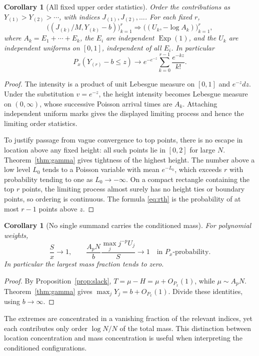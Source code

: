 \documentclass[11pt,a4paper]{article}
\numberwithin{equation}{section}
\newtheorem{corollary}[theorem]{Corollary}
\theoremstyle{definition}
\theoremstyle{remark}
\newcommand{\Exp}{\operatorname{Exp}}
\begin{document}
\begin{corollary}[All fixed upper order statistics]
\label{cor:orderstats}
Order the contributions as $Y_{(1)}>Y_{(2)}>\cdots$, with indices
$J_{(1)},J_{(2)},\ldots$. For each fixed $r$,
\begin{equation}
 \big((J_{(k)}/M,Y_{(k)}-b)\big)_{k=1}^r
 \Rightarrow \big((U_k,-\log A_k)\big)_{k=1}^r,
 \label{eq:orderstats}
\end{equation}
where $A_k=E_1+\cdots+E_k$, the $E_i$ are independent $\Exp(1)$,
and the $U_k$ are independent uniforms on $[0,1]$, independent of all
$E_i$. In particular
\begin{equation}
 P_x(Y_{(r)}-b\le z)\longrightarrow
 e^{-e^{-z}}\sum_{k=0}^{r-1}\frac{e^{-kz}}{k!}.
 \label{eq:rth}
\end{equation}
\end{corollary}
\begin{proof}
The intensity is a product of unit Lebesgue measure on $[0,1]$ and
$e^{-z}dz$. Under the substitution $v=e^{-z}$, the height intensity
becomes Lebesgue measure on $(0,\infty)$, whose successive Poisson
arrival times are $A_k$. Attaching independent uniform marks gives
the displayed limiting process and hence the limiting order statistics.

To justify passage from vague convergence to top points, there is no
escape in location above any fixed height: all such points lie in
$[0,2]$ for large $N$. Theorem~\ref{thm:gamma} gives tightness of the
highest height. The number above a low level $L_0$ tends to a Poisson
variable with mean $e^{-L_0}$, which exceeds $r$ with probability tending
to one as $L_0\to-\infty$. On a compact rectangle containing the top
$r$ points, the limiting process almost surely has no height ties or
boundary points, so ordering is continuous. The formula
\eqref{eq:rth} is the probability of at most $r-1$ points above $z$.
\end{proof}

\begin{corollary}[No single summand carries the conditioned mass]
\label{cor:nocondensation}
For polynomial weights,
\begin{equation}
 \frac{S}{x}\longrightarrow1,
 \qquad
 \frac{A_pN}{b}\frac{\max_j j^{-p}U_j}{S}\longrightarrow1
 \quad\text{in }P_x\text{-probability}.
 \label{eq:nocondensation}
\end{equation}
In particular the largest mass fraction tends to zero.
\end{corollary}
\begin{proof}
By Proposition~\ref{prop:slack}, $T=\mu-H=\mu+O_{P_x}(1)$,
while $\mu\sim A_pN$. Theorem~\ref{thm:gamma} gives
$\max_jY_j=b+O_{P_x}(1)$. Divide these identities, using $b\to\infty$.
\end{proof}
The extremes are concentrated in a vanishing fraction of the relevant
indices, yet each contributes only order $\log N/N$ of the total mass.
This distinction between location concentration and mass concentration
is useful when interpreting the conditioned configurations.
\end{document}
